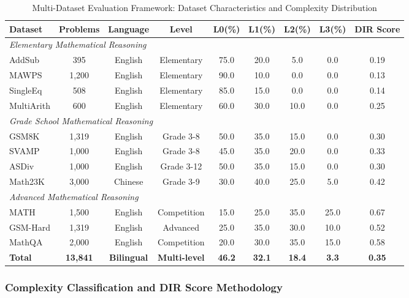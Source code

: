 \begin{table*}[htbp]
\caption{Multi-Dataset Evaluation Framework: Dataset Characteristics and Complexity Distribution}
\label{tab:dataset_framework}
\centering
\small
\begin{tabular}{lcccccccc}
\toprule
\textbf{Dataset} & \textbf{Problems} & \textbf{Language} & \textbf{Level} & \textbf{L0(\%)} & \textbf{L1(\%)} & \textbf{L2(\%)} & \textbf{L3(\%)} & \textbf{DIR Score} \\
\midrule
\multicolumn{9}{l}{\textit{Elementary Mathematical Reasoning}} \\
AddSub & 395 & English & Elementary & 75.0 & 20.0 & 5.0 & 0.0 & 0.19 \\
MAWPS & 1,200 & English & Elementary & 90.0 & 10.0 & 0.0 & 0.0 & 0.13 \\
SingleEq & 508 & English & Elementary & 85.0 & 15.0 & 0.0 & 0.0 & 0.14 \\
MultiArith & 600 & English & Elementary & 60.0 & 30.0 & 10.0 & 0.0 & 0.25 \\
\midrule
\multicolumn{9}{l}{\textit{Grade School Mathematical Reasoning}} \\
GSM8K & 1,319 & English & Grade 3-8 & 50.0 & 35.0 & 15.0 & 0.0 & 0.30 \\
SVAMP & 1,000 & English & Grade 3-8 & 45.0 & 35.0 & 20.0 & 0.0 & 0.33 \\
ASDiv & 1,000 & English & Grade 3-12 & 50.0 & 35.0 & 15.0 & 0.0 & 0.30 \\
Math23K & 3,000 & Chinese & Grade 3-9 & 30.0 & 40.0 & 25.0 & 5.0 & 0.42 \\
\midrule
\multicolumn{9}{l}{\textit{Advanced Mathematical Reasoning}} \\
MATH & 1,500 & English & Competition & 15.0 & 25.0 & 35.0 & 25.0 & 0.67 \\
GSM-Hard & 1,319 & English & Advanced & 25.0 & 35.0 & 30.0 & 10.0 & 0.52 \\
MathQA & 2,000 & English & Competition & 20.0 & 30.0 & 35.0 & 15.0 & 0.58 \\
\midrule
\textbf{Total} & \textbf{13,841} & \textbf{Bilingual} & \textbf{Multi-level} & \textbf{46.2} & \textbf{32.1} & \textbf{18.4} & \textbf{3.3} & \textbf{0.35} \\
\bottomrule
\end{tabular}
\end{table*}

\subsubsection{Complexity Classification and DIR Score Methodology}

